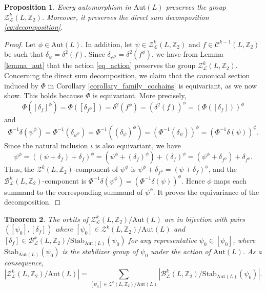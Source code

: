 \documentclass[11pt,a4paper]{article}
\newtheorem{theorem}{Theorem}[section]
\newtheorem{proposition}[theorem]{Proposition}
\begin{document}
\begin{proposition}\label{proposition_aut} Every automorphism in $\mathrm{Aut}(L)$ preserves the group $\mathcal{Z}_\mathcal{L}^k(L,\mathbb{Z}_2)$. Moreover, it preserves the direct sum decomposition \eqref{eq:decomposition}.
\end{proposition}

\begin{proof} Let $\phi\in\mathrm{Aut}(L)$. In addition, let $\psi\in \mathcal{Z}_\mathcal{L}^k(L,\mathbb{Z}_2)$ and $f\in \mathcal{C}^{k-1}(L,\mathbb{Z}_2)$ be such that $\delta_\psi=\delta^2(f)$. Since $\delta_{\psi^\phi}=\delta^2(f^\phi)$, we have from Lemma \ref{lemma_aut} that the action \eqref{eq_action} preserves the group $\mathcal{Z}_\mathcal{L}^k(L,\mathbb{Z}_2)$. Concerning the direct sum decomposition, we claim that the canonical section induced by $\Phi$ in Corollary \ref{corollary_family_cochains} is equivariant, as we now show. This holds because $\Phi$ is equivariant. More precisely,
\[\Phi([\delta_f]^\phi) = \Phi([\delta_{f^\phi}]) = \delta^2(f^\phi) = (\delta^2(f))^\phi = (\Phi([\delta_f]))^\phi\]
and
\[\Phi^{-1}\delta(\psi^\phi)=\Phi^{-1}(\delta_{\psi^\phi}) = \Phi^{-1}((\delta_\psi)^\phi) = (\Phi^{-1}(\delta_\psi))^\phi=(\Phi^{-1}\delta(\psi))^\phi.\]
Since the natural inclusion $\iota$ is also equivariant, we have
\[\psi^\phi =\left((\psi+\delta_f)+\delta_f\right)^\phi=\left(\psi^\phi +(\delta_f)^\phi\right)+(\delta_f)^\phi=\left(\psi^\phi +\delta_{f^\phi}\right)+\delta_{f^\phi}.\]
Thus, the $\mathcal{Z}^k(L,\mathbb{Z}_2)$-component of $\psi^\phi$ is $\psi^\phi + \delta_{f^\phi}=(\psi+\delta_f)^\phi$, and the $\mathcal{B}_\mathcal{L}^k(L,\mathbb{Z}_2)$-component is $\Phi^{-1}\delta(\psi^\phi)=(\Phi^{-1}\delta(\psi))^\phi$. Hence $\phi$ maps each summand to the corresponding summand of $\psi^\phi$. It proves the equivariance of the decomposition.
\end{proof}

\begin{theorem}\label{theorem_aut} The orbits of $\mathcal{Z}_\mathcal{L}^k(L,\mathbb{Z}_2)/\mathrm{Aut}(L)$ are in bijection with pairs $([\psi_0], [\delta_f])$ where $[\psi_0]\in \mathcal{Z}^k(L,\mathbb{Z}_2)/\mathrm{Aut}(L)$ and $[\delta_f]\in \mathcal{B}_\mathcal{L}^k(L,\mathbb{Z}_2)/\mathrm{Stab}_{\mathrm{Aut}(L)}(\psi_0)$ for any representative $\psi_0\in [\psi_0]$, where $\mathrm{Stab}_{\mathrm{Aut}(L)}(\psi_0)$ is the stabilizer group of $\psi_0$ under the action of $\mathrm{Aut}(L)$. As a consequence,
\[\left|\mathcal{Z}_\mathcal{L}^k(L,\mathbb{Z}_2)/\mathrm{Aut}(L)\right|=\sum_{[\psi_0]\in \mathcal{Z}^k(L,\mathbb{Z}_2)/\mathrm{Aut}(L)} \left|\mathcal{B}_\mathcal{L}^k(L,\mathbb{Z}_2)/\mathrm{Stab}_{\mathrm{Aut}(L)}(\psi_0)\right|.\]
\end{theorem}
\end{document}
